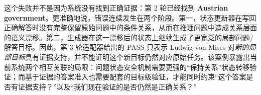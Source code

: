 \documentclass[11pt]{article}
\begin{document}

	\traceend

	这个失败并不是因为系统没有找到正确证据：第 2 轮已经找到 \textbf{Austrian government}。更准确地说，错误连续发生在两个阶段。第一，状态更新器在写回正确解答时没有完整保留原始问题中的条件关系，从而在推理问题中造成关系层面的语义漂移。第二，生成器在这一漂移后的状态上继续生成了更宽泛的局部问题/解答目标。因此，第 3 轮适配器给出的 PASS 只表示 Ludwig von Mises 对\emph{新的局部目标}具有证据支持，并不能证明这个新目标仍然对应原始任务。该案例暴露出当前系统两个相互关联的局限：问题状态安全机制需要更强的“保持关系”状态转移验证；而基于证据的答案准入也需要配套的目标级验证，才能同时约束“这个答案是否有证据支持？”以及“我们现在验证的是否仍然是正确关系？”
\end{document}
